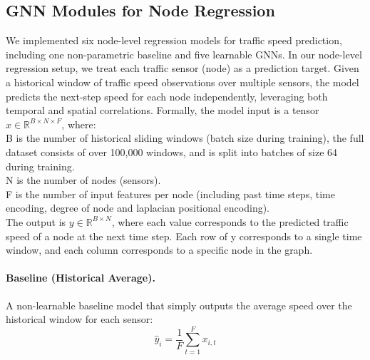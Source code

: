\documentclass[runningheads]{llncs}
\begin{document}
\subsection{GNN Modules for Node Regression}
We implemented six node-level regression models for traffic speed prediction, including one non-parametric baseline and five learnable GNNs. In our node-level regression setup, we treat each traffic sensor (node) as a prediction target. Given a historical window of traffic speed observations over multiple sensors, the model predicts the next-step speed for each node independently, leveraging both temporal and spatial correlations. Formally, the model input is a tensor $x \in \mathbb{R}^{B \times N \times F}$, where: \\
B is the number of historical sliding windows (batch size during training), the full dataset consists of over 100,000 windows, and is split into batches of size 64 during training.\\
N is the number of nodes (sensors).\\
F is the number of input features per node (including past time steps, time encoding, degree of node and laplacian positional encoding).\\
The output is $y \in \mathbb{R}^{B \times N}$, where each value corresponds to the predicted traffic speed of a node at the next time step. Each row of y corresponds to a single time window, and each column corresponds to a specific node in the graph.

\paragraph{Baseline (Historical Average).}
A non-learnable baseline model that simply outputs the average speed over the historical window for each sensor:
\begin{equation}
\hat{y}_i = \frac{1}{F} \sum_{t=1}^{F} x_{i,t}
\end{equation}
\end{document}
